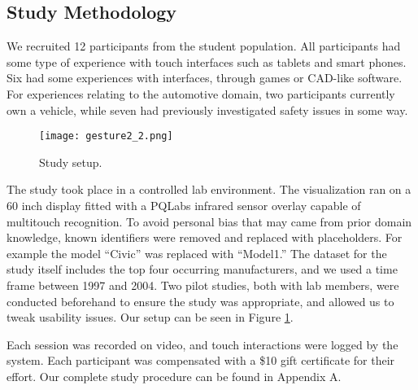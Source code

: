 

\subsection{Study Methodology}
We recruited 12 participants from the student population. All participants had some
type of experience with touch interfaces such as tablets and smart phones. Six 
had some experiences with \threed interfaces, through games or CAD-like
software. For experiences relating to the automotive domain, two participants
currently own a vehicle, while seven had previously investigated safety issues in
some way. 
 
	\begin{figure}
	 \centering  
	 \texttt{[image: gesture2\_2.png]}  
	 \caption{Study setup.}
	 \label{figure:study}
	\end{figure}


The study took place in a controlled lab environment. The visualization ran on
a 60 inch display fitted with a PQLabs infrared sensor overlay capable of
multitouch recognition. To avoid personal bias that may came from prior domain
knowledge, known identifiers were removed and replaced with placeholders.
For example the model ``Civic'' was replaced with ``Model1.'' The dataset for
the study itself includes the top four occurring manufacturers, and we used a time
frame between 1997 and 2004. Two pilot studies, both with lab members, were
conducted beforehand to ensure the study was appropriate, and allowed us to
tweak usability issues. Our setup can be seen in Figure \ref{figure:study}.

Each session was recorded on video, and touch interactions were
logged by the system. Each participant was compensated with a \$10 gift
certificate for their effort. Our complete study procedure can be found in Appendix A.


